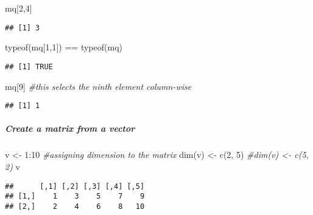 \documentclass[
]{article}
\newenvironment{Shaded}{\begin{snugshade}}{\end{snugshade}}
\newcommand{\CommentTok}[1]{\textcolor[rgb]{0.56,0.35,0.01}{\textit{#1}}}
\newcommand{\DecValTok}[1]{\textcolor[rgb]{0.00,0.00,0.81}{#1}}
\newcommand{\FunctionTok}[1]{\textcolor[rgb]{0.00,0.00,0.00}{#1}}
\newcommand{\NormalTok}[1]{#1}
\newcommand{\OtherTok}[1]{\textcolor[rgb]{0.56,0.35,0.01}{#1}}
\newcommand{\SpecialCharTok}[1]{\textcolor[rgb]{0.00,0.00,0.00}{#1}}
\begin{document}
\begin{Shaded}
\begin{Highlighting}[]
\NormalTok{mq[}\DecValTok{2}\NormalTok{,}\DecValTok{4}\NormalTok{]}
\end{Highlighting}
\end{Shaded}

\begin{verbatim}
## [1] 3
\end{verbatim}

\begin{Shaded}
\begin{Highlighting}[]
\FunctionTok{typeof}\NormalTok{(mq[}\DecValTok{1}\NormalTok{,}\DecValTok{1}\NormalTok{]) }\SpecialCharTok{==} \FunctionTok{typeof}\NormalTok{(mq)}
\end{Highlighting}
\end{Shaded}

\begin{verbatim}
## [1] TRUE
\end{verbatim}

\begin{Shaded}
\begin{Highlighting}[]
\NormalTok{mq[}\DecValTok{9}\NormalTok{] }\CommentTok{\#this selects the ninth element column{-}wise}
\end{Highlighting}
\end{Shaded}

\begin{verbatim}
## [1] 1
\end{verbatim}

\hypertarget{create-a-matrix-from-a-vector}{%
\subparagraph{Create a matrix from a
vector}\label{create-a-matrix-from-a-vector}}

\begin{Shaded}
\begin{Highlighting}[]
\NormalTok{v }\OtherTok{\textless{}{-}} \DecValTok{1}\SpecialCharTok{:}\DecValTok{10}
\CommentTok{\#assigning dimension to the matrix}
\FunctionTok{dim}\NormalTok{(v) }\OtherTok{\textless{}{-}} \FunctionTok{c}\NormalTok{(}\DecValTok{2}\NormalTok{, }\DecValTok{5}\NormalTok{) }
\CommentTok{\#dim(v) \textless{}{-} c(5, 2) }
\NormalTok{v}
\end{Highlighting}
\end{Shaded}

\begin{verbatim}
##      [,1] [,2] [,3] [,4] [,5]
## [1,]    1    3    5    7    9
## [2,]    2    4    6    8   10
\end{verbatim}
\end{document}
